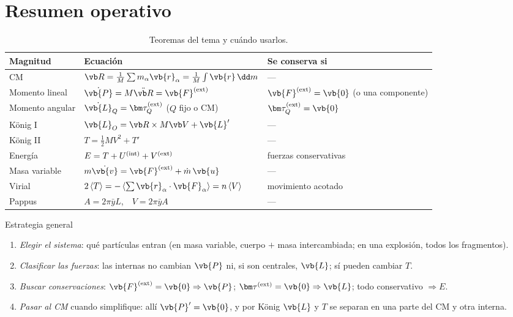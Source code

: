 \section{Resumen operativo}
\label{sec:resumen}

\begin{table}[ht]
\centering
\caption{Teoremas del tema y cuándo usarlos.}
\label{tab:resumen}
\small
\renewcommand{\arraystretch}{1.75}
\begin{tabular}{@{}l l l@{}}
\toprule
\color{cian}Magnitud & \color{cian}Ecuación & \color{cian}Se conserva si\\
\midrule
CM & $\Rc=\frac1M\sum m_{\alpha}\vb{r}_{\alpha}=\frac1M\int\vb{r}\,\dd m$ & ---\\
Momento lineal & $\dot{\vb{P}}=M\ddot{\Rc}=\vb{F}\ext$ & $\vb{F}\ext=\vb{0}$ (o una componente)\\
Momento angular & $\dot{\vb{L}}_{Q}=\vtorque_{Q}\ext$ ($Q$ fijo o CM) & $\vtorque_{Q}\ext=\vb{0}$\\
König I & $\vb{L}_{O}=\Rc\times M\Vc+\vb{L}'$ & ---\\
König II & $T=\frac12MV^{2}+T'$ & ---\\
Energía & $E=T+U^{(\mathrm{int})}+V^{(\mathrm{ext})}$ & fuerzas conservativas\\
Masa variable & $m\dot{\vb{v}}=\vb{F}\ext+\dot m\,\vb{u}$ & ---\\
Virial & $2\prom{T}=-\prom{\sum\vb{r}_{\alpha}\cdot\vb{F}_{\alpha}}=n\prom{V}$ & movimiento acotado\\
Pappus & $A=2\pi\bar y L$,\ \ $V=2\pi\bar y A$ & ---\\
\bottomrule
\end{tabular}
\end{table}

\begin{clave}{Estrategia general}
\begin{enumerate}[leftmargin=1.4em]
  \item \emph{Elegir el sistema}: qué partículas entran (en masa variable,
        cuerpo $+$ masa intercambiada; en una explosión, todos los fragmentos).
  \item \emph{Clasificar las fuerzas}: las internas no cambian $\vb{P}$ ni, si son
        centrales, $\vb{L}$; sí pueden cambiar $T$.
  \item \emph{Buscar conservaciones}: $\vb{F}\ext=\vb{0}\Rightarrow\vb{P}$;
        $\vtorque\ext=\vb{0}\Rightarrow\vb{L}$; todo conservativo $\Rightarrow E$.
  \item \emph{Pasar al CM} cuando simplifique: allí $\vb{P}'=\vb{0}$, y por
        König $\vb{L}$ y $T$ se separan en una parte del CM y otra interna.
\end{enumerate}
\end{clave}

